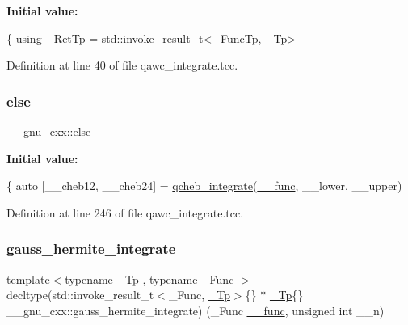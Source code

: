 {\bfseries Initial value\+:}
\begin{DoxyCode}
\{
      \textcolor{keyword}{using} \hyperlink{namespace____gnu__cxx_a886e03ece3d53ff7fa6c098a40f93fa5}{\_RetTp} = std::invoke\_result\_t<\_FuncTp, \_Tp>
\end{DoxyCode}


Definition at line 40 of file qawc\+\_\+integrate.\+tcc.

\mbox{\label{namespace____gnu__cxx_ad845303a33fef33286c11510aea1d5cc}} 
\subsubsection{\texorpdfstring{else}{else}}
{\footnotesize\ttfamily \+\_\+\+\_\+gnu\+\_\+cxx\+::else}

{\bfseries Initial value\+:}
\begin{DoxyCode}
\{
          \textcolor{keyword}{auto} [\_\_cheb12, \_\_cheb24] = \hyperlink{namespace____gnu__cxx_aa8e32fefb92558e0c8ddb94c25fd637b}{qcheb\_integrate}(\hyperlink{namespace____gnu__cxx_af2b2f0c7a2ae72b922b1afefae5a65b2}{\_\_func}, \_\_lower, \_\_upper)
\end{DoxyCode}


Definition at line 246 of file qawc\+\_\+integrate.\+tcc.

\mbox{\label{namespace____gnu__cxx_a0e320b6b2f1b1befb9019e587648534d}} 
\subsubsection{\texorpdfstring{gauss\+\_\+hermite\+\_\+integrate}{gauss\_hermite\_integrate}}
{\footnotesize\ttfamily template$<$typename \+\_\+\+Tp , typename \+\_\+\+Func $>$ \\
decltype(std\+::invoke\+\_\+result\+\_\+t$<$\+\_\+\+Func, \hyperlink{namespace____gnu__cxx_a3b19a9c800ca194374ef9172290f7d79}{\+\_\+\+Tp}$>$\{\} $\ast$ \hyperlink{namespace____gnu__cxx_a3b19a9c800ca194374ef9172290f7d79}{\+\_\+\+Tp}\{\} \+\_\+\+\_\+gnu\+\_\+cxx\+::gauss\+\_\+hermite\+\_\+integrate) (\+\_\+\+Func \hyperlink{namespace____gnu__cxx_af2b2f0c7a2ae72b922b1afefae5a65b2}{\+\_\+\+\_\+func}, unsigned int \+\_\+\+\_\+n)}



